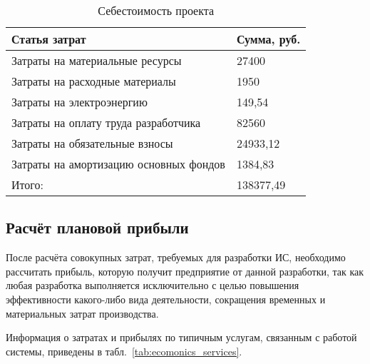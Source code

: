 \begin{footnotesize}
\begin{longtable}[h]{|p{}|p{}|}
	\caption{\label{tab:sebest}Себестоимость проекта} \\
	\hline
		\textbf{Статья затрат} &
		\textbf{Сумма, руб.} \\
	\hline
		Затраты на материальные ресурсы & 27400 \\ \hline
		Затраты на расходные материалы & 1950 \\ \hline
		Затраты на электроэнергию & 149,54 \\ \hline
		Затраты на оплату труда разработчика & 82560 \\ \hline
		Затраты на обязательные взносы & 24933,12 \\ \hline
		Затраты на амортизацию основных фондов & 1384,83 \\ \hline
		Итого: & 138377,49 \\ \hline
\end{longtable}
\end{footnotesize}

\subsection{Расчёт плановой прибыли}

После расчёта совокупных затрат, требуемых для разработки ИС, необходимо рассчитать прибыль, которую получит предприятие от данной разработки, так как любая разработка выполняется исключительно с целью повышения эффективности какого-либо вида деятельности, сокращения временных и материальных затрат производства.

Информация о затратах и прибылях по типичным услугам, связанным с работой системы, приведены в табл.~\ref{tab:ecomonics_services}.

